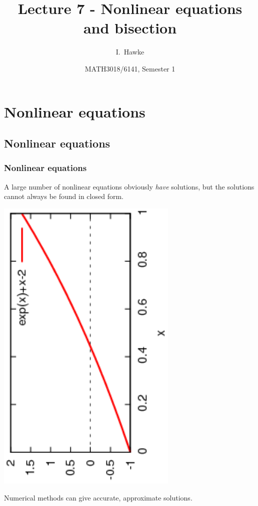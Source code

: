\documentclass{beamer}
\title[Lecture 7] %
{Lecture 7 - Nonlinear equations and bisection}
\author[I. Hawke] %
{I.~Hawke}
\institute[University of Southampton] %
{
  School of Mathematics, \\
  University of Southampton, UK
}
\date[Semester 1] %
{MATH3018/6141, Semester 1}
\begin{document}
\begin{frame}
  \titlepage
\end{frame}

\section{Nonlinear equations}

\subsection{Nonlinear equations}

\begin{frame}
  \frametitle{Nonlinear equations}

  A large number of nonlinear equations obviously \emph{have}
  solutions, but the solutions cannot always be found in closed form.

  \begin{center}
    \includegraphics[angle=-90,width=0.65\textwidth]{figures/Nonlinear1}
  \end{center} \pause

  Numerical methods %
  can give accurate, approximate solutions.%


\end{frame}
\end{document}
